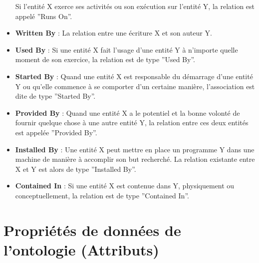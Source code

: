 \begin{itemize}
	  Si l'entité X exerce ses activités ou son exécution sur l'entité Y, la
	  relation est appelé ''Runs On''.
  \item \textbf{Written By} : 
	  La relation entre une écriture X et son auteur Y.
  \item \textbf{Used By} : 
	  Si une entité X fait l'usage d'une entité Y à n'importe quelle moment
	  de son exercice, la relation est de type ''Used By''.
  \item \textbf{Started By} : 
	  Quand une entité X est responsable du démarrage d'une entité Y ou
	  qu'elle commence à se comporter d'un certaine manière, l'association
	  est dite de type ''Started By''.
  \item \textbf{Provided By} : 
	  Quand une entité X a le potentiel et la bonne volonté de fournir
	  quelque chose à une autre entité Y, la relation entre ces deux entités
	  est appelée ''Provided By''.
  \item \textbf{Installed By} : 
	  Une entité X peut mettre en place un programme Y dans une machine de
	  manière à accomplir son but recherché. La relation existante entre X
	  et Y est alors de type ''Installed By''.
  \item \textbf{Contained In} :
	  Si une entité X est contenue dans Y, physiquement ou conceptuellement,
	  la relation est de type ''Contained In''.
\end{itemize}

\section{Propriétés de données de l'ontologie (Attributs)}

